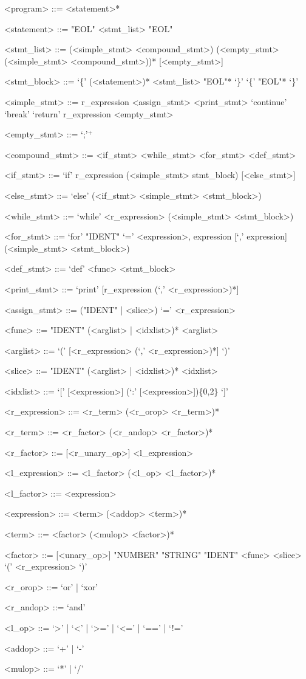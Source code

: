 \documentclass[10pt,a4paper]{article}
\begin{document}
\begin{grammar}
<program> ::= <statement>*

<statement> ::= "EOL"
	\alt <stmt_list> "EOL"

<stmt_list> ::= (<simple_stmt> \alt <compound_stmt>) (<empty_stmt> (<simple_stmt> \alt <compound_stmt>))* [<empty_stmt>]

<stmt_block> ::= `\{' (<statement>)* <stmt_list> "EOL"* `\}' 
                    \alt `\{' "EOL"* `\}'

<simple_stmt> ::= r_expression
	\alt <assign_stmt>                    
	\alt <print_stmt>
	\alt `continue'
	\alt `break'
	\alt `return' r_expression
	\alt <empty_stmt>
	
<empty_stmt> ::= `;'$^{+}$

<compound_stmt> ::= <if_stmt>
	\alt <while_stmt>
	\alt <for_stmt>
	\alt <def_stmt>
	
<if_stmt> ::= `if' r_expression (<simple_stmt> \alt stmt_block) [<else_stmt>]

<else_stmt> ::= `else' (<if_stmt> \alt <simple_stmt> \alt <stmt_block>)
              
<while_stmt> ::= `while' <r_expression> (<simple_stmt> \alt <stmt_block>)

<for_stmt> ::= `for' "IDENT" `=' <expression>, expression [`,' expression] (<simple_stmt> \alt <stmt_block>)

<def_stmt> ::= `def' <func> <stmt_block>

<print_stmt> ::= `print' [r_expression (`,' <r_expression>)*]

<assign_stmt> ::= ("IDENT" | <slice>) `=' <r_expression>

<func> ::= "IDENT" (<arglist> | <idxlist>)* <arglist>

<arglist> ::= `(' [<r_expression> (`,' <r_expression>)*] `)'

<slice> ::= "IDENT" (<arglist> | <idxlist>)* <idxlist>

<idxlist> ::= `[' [<expression>] (`:' [<expression>])\{0,2\} `]'

<r_expression> ::= <r_term> (<r_orop> <r_term>)*

<r_term> ::= <r_factor> (<r_andop> <r_factor>)*

<r_factor> ::= [<r_unary_op>] <l_expression>

<l_expression> ::= <l_factor> (<l_op> <l_factor>)*

<l_factor> ::= <expression>

<expression> ::= <term> (<addop> <term>)*

<term> ::= <factor> (<mulop> <factor>)*

<factor> ::= [<unary_op>] "NUMBER"
	\alt "STRING"
	\alt "IDENT"
	\alt <func>
	\alt <slice>
	\alt `(' <r_expression> `)'
	
<r_orop> ::= `or' | `xor'

<r_andop> ::= `and'

<l_op> ::= `>' | `<' | `>=' | `<=' | `==' | `!='

<addop> ::= `+' | `-'

<mulop> ::= `*' | `/'

\end{grammar}
\end{document}
